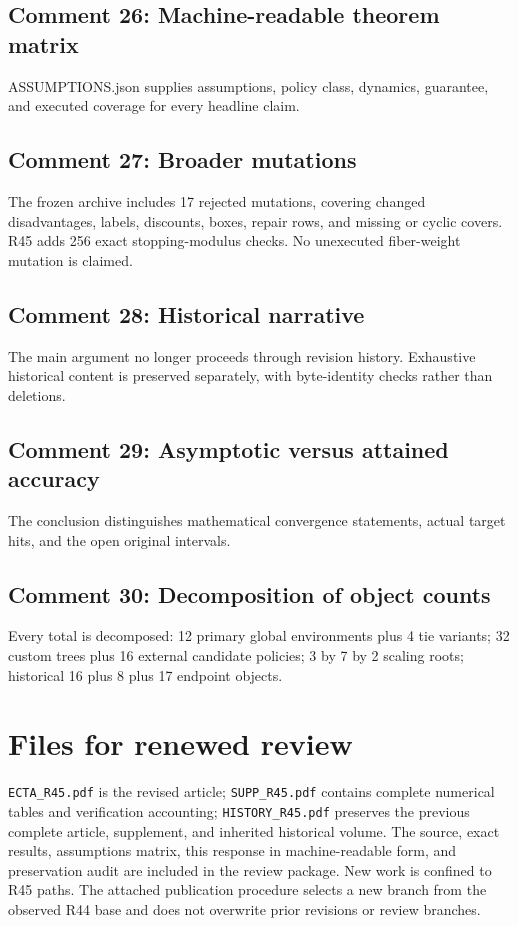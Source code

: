 \subsection{Comment 26: Machine-readable theorem matrix}
ASSUMPTIONS.json supplies assumptions, policy class, dynamics, guarantee, and executed coverage for every headline claim.

\subsection{Comment 27: Broader mutations}
The frozen archive includes 17 rejected mutations, covering changed disadvantages, labels, discounts, boxes, repair rows, and missing or cyclic covers. R45 adds 256 exact stopping-modulus checks. No unexecuted fiber-weight mutation is claimed.

\subsection{Comment 28: Historical narrative}
The main argument no longer proceeds through revision history. Exhaustive historical content is preserved separately, with byte-identity checks rather than deletions.

\subsection{Comment 29: Asymptotic versus attained accuracy}
The conclusion distinguishes mathematical convergence statements, actual target hits, and the open original intervals.

\subsection{Comment 30: Decomposition of object counts}
Every total is decomposed: 12 primary global environments plus 4 tie variants; 32 custom trees plus 16 external candidate policies; 3 by 7 by 2 scaling roots; historical 16 plus 8 plus 17 endpoint objects.

\section{Files for renewed review}
\texttt{ECTA\_R45.pdf} is the revised article; \texttt{SUPP\_R45.pdf} contains complete numerical tables and verification accounting; \texttt{HISTORY\_R45.pdf} preserves the previous complete article, supplement, and inherited historical volume. The source, exact results, assumptions matrix, this response in machine-readable form, and preservation audit are included in the review package. New work is confined to R45 paths. The attached publication procedure selects a new branch from the observed R44 base and does not overwrite prior revisions or review branches.



